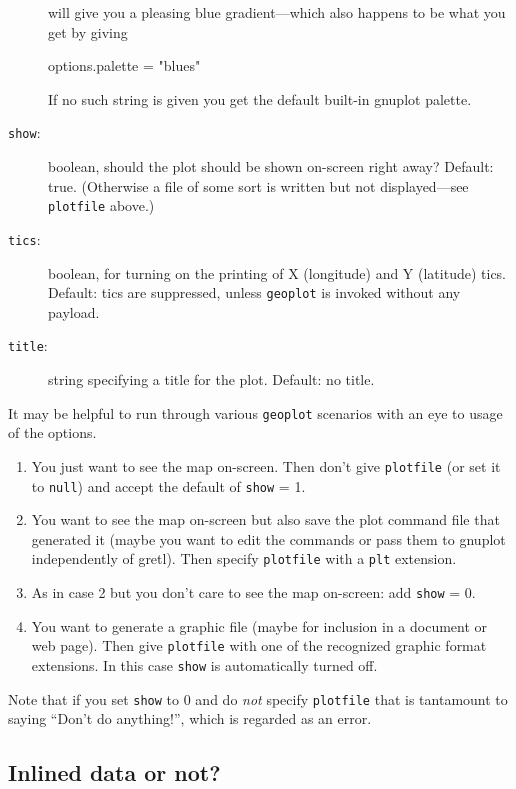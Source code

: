 \documentclass{article}
\begin{document}
\begin{description}
\begin{code}
  \end{code}
  will give you a pleasing blue gradient---which also happens to be
  what you get by giving
  \begin{code}
    options.palette = "blues"
  \end{code}
  If no such string is given you get the default built-in
  \textsf{gnuplot} palette.
\item[\texttt{show}:] boolean, should the plot should be shown
  on-screen right away? Default: true. (Otherwise a file of some sort
  is written but not displayed---see \texttt{plotfile} above.)
\item[\texttt{tics}:] boolean, for turning on the printing of X
  (longitude) and Y (latitude) tics. Default: tics are suppressed,
  unless \texttt{geoplot} is invoked without any payload.
\item[\texttt{title}:] string specifying a title for the
  plot. Default: no title.
\end{description}

It may be helpful to run through various \texttt{geoplot} scenarios
with an eye to usage of the options.

\begin{enumerate}
\item You just want to see the map on-screen. Then don't give
  \texttt{plotfile} (or set it to \texttt{null}) and accept the
  default of \texttt{show} = 1.\label{just-see}
\item You want to see the map on-screen but also save the plot command
  file that generated it (maybe you want to edit the commands or pass
  them to \textsf{gnuplot} independently of gretl). Then specify
  \texttt{plotfile} with a \texttt{plt} extension.\label{see-and-save}
\item As in case 2 but you don't care to see the map on-screen: add
  \texttt{show} = 0.
\item You want to generate a graphic file (maybe for inclusion in a
  document or web page). Then give \texttt{plotfile} with one of the
  recognized graphic format extensions. In this case \texttt{show} is
  automatically turned off.
\end{enumerate}

Note that if you set \texttt{show} to 0 and do \textit{not} specify
\texttt{plotfile} that is tantamount to saying ``Don't do anything!'',
which is regarded as an error.

\subsection{Inlined data or not?}
\end{document}
